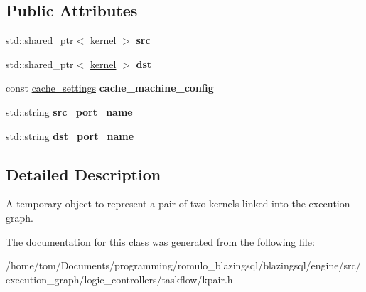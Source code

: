 \subsection*{Public Attributes}
\begin{DoxyCompactItemize}
\item 
\mbox{\label{classral_1_1cache_1_1kpair_aa317992d3bb0b1d2f05ad9ea23c598c2}} 
std\+::shared\+\_\+ptr$<$ \hyperlink{classral_1_1cache_1_1kernel}{kernel} $>$ {\bfseries src}
\item 
\mbox{\label{classral_1_1cache_1_1kpair_ab85ad0c3b409afad4f1407c025700246}} 
std\+::shared\+\_\+ptr$<$ \hyperlink{classral_1_1cache_1_1kernel}{kernel} $>$ {\bfseries dst}
\item 
\mbox{\label{classral_1_1cache_1_1kpair_a8e58e8a2968febb38c715e9631ad568d}} 
const \hyperlink{structral_1_1cache_1_1cache__settings}{cache\+\_\+settings} {\bfseries cache\+\_\+machine\+\_\+config}
\item 
\mbox{\label{classral_1_1cache_1_1kpair_ae433fb160a0d262ddaeef08041e69113}} 
std\+::string {\bfseries src\+\_\+port\+\_\+name}
\item 
\mbox{\label{classral_1_1cache_1_1kpair_afc77653f6957aede14a5d55b73b18439}} 
std\+::string {\bfseries dst\+\_\+port\+\_\+name}
\end{DoxyCompactItemize}


\subsection{Detailed Description}
A temporary object to represent a pair of two kernels linked into the execution graph. 

The documentation for this class was generated from the following file\+:\begin{DoxyCompactItemize}
\item 
/home/tom/\+Documents/programming/romulo\+\_\+blazingsql/blazingsql/engine/src/execution\+\_\+graph/logic\+\_\+controllers/taskflow/kpair.\+h\end{DoxyCompactItemize}
